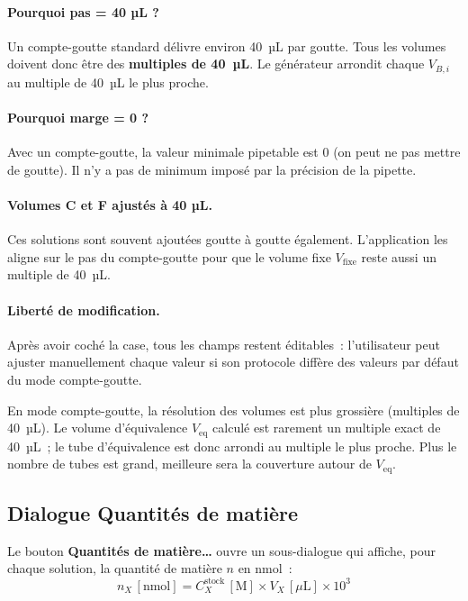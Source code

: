 \documentclass[12pt, a4paper]{article}
\begin{document}
\paragraph{Pourquoi pas = 40 µL ?}
Un compte-goutte standard délivre environ 40~µL par goutte. Tous les volumes
doivent donc être des \textbf{multiples de 40~µL}. Le générateur arrondit
chaque $V_{B,i}$ au multiple de 40~µL le plus proche.

\paragraph{Pourquoi marge = 0 ?}
Avec un compte-goutte, la valeur minimale pipetable est 0 (on peut ne pas
mettre de goutte). Il n'y a pas de minimum imposé par la précision de la
pipette.

\paragraph{Volumes C et F ajustés à 40 µL.}
Ces solutions sont souvent ajoutées goutte à goutte également. L'application
les aligne sur le pas du compte-goutte pour que le volume fixe
$V_\text{fixe}$ reste aussi un multiple de 40~µL.

\paragraph{Liberté de modification.}
Après avoir coché la case, tous les champs restent éditables~: l'utilisateur
peut ajuster manuellement chaque valeur si son protocole diffère des valeurs
par défaut du mode compte-goutte.

\begin{remarque}
En mode compte-goutte, la résolution des volumes est plus grossière
(multiples de 40~µL). Le volume d'équivalence $V_\text{eq}$ calculé est
rarement un multiple exact de 40~µL~; le tube \og d'équivalence\fg{}
est donc arrondi au multiple le plus proche. Plus le nombre de tubes est
grand, meilleure sera la couverture autour de $V_\text{eq}$.
\end{remarque}

\subsection{Dialogue \og Quantités de matière\fg{}}
\label{subsec:qmol}

Le bouton \textbf{Quantités de matière\ldots} ouvre un sous-dialogue qui
affiche, pour chaque solution, la quantité de matière $n$ en nmol~:
\[
n_X\,[\text{nmol}] = C_X^\text{stock}\,[\text{M}] \times V_X\,[\mu\text{L}]
                   \times 10^3
\]
\end{document}
